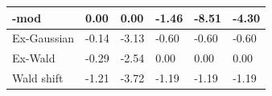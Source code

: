 \begin{tabular}{|l|l|l|l|l|l|}
\hline
\rocdd{}-mod&0.00&0.00&-1.46&-8.51&-4.30\\\hline
Ex-Gaussian&-0.14&-3.13&-0.60&-0.60&-0.60\\\hline
Ex-Wald&-0.29&-2.54&0.00&0.00&0.00\\\hline
Wald shift&-1.21&-3.72&-1.19&-1.19&-1.19\\\hline
\end{tabular}
